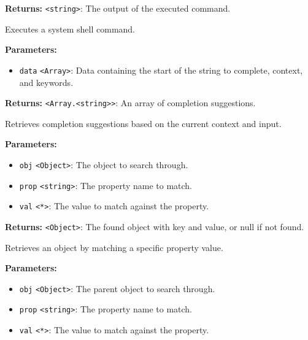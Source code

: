 \documentclass[12pt,a4paper]{article}
\begin{document}
\noindent \textbf{Returns:} \texttt{<string>}: The output of the executed command.

\noindent Executes a system shell command.

\vspace{5mm}
\noindent {}


\noindent \textbf{Parameters:}
\begin{itemize}
  \item \texttt{data} \texttt{<Array>}: Data containing the start of the string to complete, context, and keywords.
\end{itemize}

\noindent \textbf{Returns:} \texttt{<Array.<string>>}: An array of completion suggestions.

\noindent Retrieves completion suggestions based on the current context and input.

\vspace{5mm}
\noindent {}


\noindent \textbf{Parameters:}
\begin{itemize}
  \item \texttt{obj} \texttt{<Object>}: The object to search through.
  \item \texttt{prop} \texttt{<string>}: The property name to match.
  \item \texttt{val} \texttt{<*>}: The value to match against the property.
\end{itemize}

\noindent \textbf{Returns:} \texttt{<Object>}: The found object with key and value, or null if not found.

\noindent Retrieves an object by matching a specific property value.

\vspace{5mm}
\noindent {}


\noindent \textbf{Parameters:}
\begin{itemize}
  \item \texttt{obj} \texttt{<Object>}: The parent object to search through.
  \item \texttt{prop} \texttt{<string>}: The property name to match.
  \item \texttt{val} \texttt{<*>}: The value to match against the property.
\end{itemize}
\end{document}
